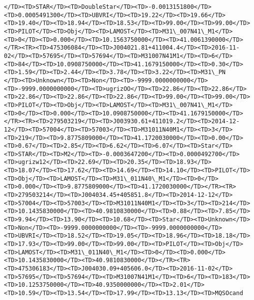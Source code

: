 \documentclass[11pt]{article}
\begin{document}
\begin{Verbatim}[commandchars=\\\{\}]
</TD><TD>STAR</TD><TD>DoubleStar</TD><TD>-0.0013151800</TD><TD>0.0005491300</TD><TD>UBVRI</TD><TD>19.22</TD><TD>19.66</TD><TD>19.40</TD><TD>18.94</TD><TD>18.53</TD><TD>99.00</TD><TD>99.00</TD><TD>PILOT</TD><TD>Obj</TD><TD>LAMOST</TD><TD>M31\_007N41\_M1</TD><TD>0</TD><TD>0.000</TD><TD>10.1563750000</TD><TD>41.0061390000</TD></TR><TR><TD>475306084</TD><TD>J004021.81+411004.4</TD><TD>2016-11-02</TD><TD>57695</TD><TD>57694</TD><TD>M31007N41M1</TD><TD>6</TD><TD>84</TD><TD>10.0908750000</TD><TD>41.1679150000</TD><TD>0.30</TD><TD>1.59</TD><TD>2.44</TD><TD>3.78</TD><TD>3.22</TD><TD>M31\_PN    </TD><TD>Unknown</TD><TD>Non</TD><TD>-9999.0000000000</TD><TD>-9999.0000000000</TD><TD>ugrizOO</TD><TD>22.86</TD><TD>22.86</TD><TD>22.86</TD><TD>22.86</TD><TD>22.86</TD><TD>99.00</TD><TD>99.00</TD><TD>PILOT</TD><TD>Obj</TD><TD>LAMOST</TD><TD>M31\_007N41\_M1</TD><TD>0</TD><TD>0.000</TD><TD>10.0908750000</TD><TD>41.1679150000</TD></TR><TR><TD>279503219</TD><TD>J003930.61+411019.2</TD><TD>2014-12-12</TD><TD>57004</TD><TD>57003</TD><TD>M31011N40M1</TD><TD>3</TD><TD>219</TD><TD>9.8775809000</TD><TD>41.1720030000</TD><TD>0.00</TD><TD>0.67</TD><TD>2.85</TD><TD>6.62</TD><TD>6.07</TD><TD>Star</TD><TD>STAR</TD><TD>M2</TD><TD>-0.0003647200</TD><TD>0.0000492700</TD><TD>ugrizw12</TD><TD>22.69</TD><TD>20.35</TD><TD>18.93</TD><TD>18.07</TD><TD>17.62</TD><TD>14.69</TD><TD>14.10</TD><TD>PILOT</TD><TD>Obj</TD><TD>LAMOST</TD><TD>M31\_011N40\_M1</TD><TD>0</TD><TD>0.000</TD><TD>9.8775809000</TD><TD>41.1720030000</TD></TR><TR><TD>279503214</TD><TD>J004034.45+405851.8</TD><TD>2014-12-12</TD><TD>57004</TD><TD>57003</TD><TD>M31011N40M1</TD><TD>3</TD><TD>214</TD><TD>10.1435830000</TD><TD>40.9810830000</TD><TD>0.88</TD><TD>7.85</TD><TD>9.94</TD><TD>13.90</TD><TD>10.68</TD><TD>Star</TD><TD>Unknown</TD><TD>Non</TD><TD>-9999.0000000000</TD><TD>-9999.0000000000</TD><TD>UBVRI</TD><TD>18.52</TD><TD>19.05</TD><TD>18.96</TD><TD>18.18</TD><TD>17.93</TD><TD>99.00</TD><TD>99.00</TD><TD>PILOT</TD><TD>Obj</TD><TD>LAMOST</TD><TD>M31\_011N40\_M1</TD><TD>0</TD><TD>0.000</TD><TD>10.1435830000</TD><TD>40.9810830000</TD></TR><TR><TD>475306183</TD><TD>J004030.09+405606.0</TD><TD>2016-11-02</TD><TD>57695</TD><TD>57694</TD><TD>M31007N41M1</TD><TD>6</TD><TD>183</TD><TD>10.1253750000</TD><TD>40.9350000000</TD><TD>2.01</TD><TD>10.59</TD><TD>13.54</TD><TD>17.99</TD><TD>13.13</TD><TD>MQSOcand  
\end{Verbatim}
\end{document}
